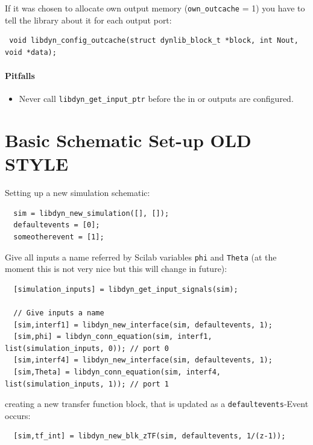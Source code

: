 \documentclass[%
	pdftex,%
	a4paper,%
	oneside,%
	11pt,%
	halfparskip,%
	headsepline,%
	bibtotocnumbered,%
	idxtotoc%
]{scrartcl}
\begin{document}
If it was chosen to allocate own output memory (\texttt{own\_outcache} = 1) you have to tell the library about it for each output port:

\begin{verbatim}
 void libdyn_config_outcache(struct dynlib_block_t *block, int Nout,  void *data);
\end{verbatim}



\paragraph{Pitfalls}

\begin{itemize}
 \item Never call \texttt{libdyn\_get\_input\_ptr} before the in or outputs are configured.
\end{itemize}




\section{Basic Schematic Set-up OLD STYLE}

Setting up a new simulation schematic:

\begin{verbatim}
  sim = libdyn_new_simulation([], []);
  defaultevents = [0];
  someotherevent = [1]; 
\end{verbatim}

Give all inputs a name referred by Scilab variables \texttt{phi} and \texttt{Theta} (at the moment this is not very nice but this will change in future):

\begin{verbatim}
  [simulation_inputs] = libdyn_get_input_signals(sim);
  
  // Give inputs a name
  [sim,interf1] = libdyn_new_interface(sim, defaultevents, 1);
  [sim,phi] = libdyn_conn_equation(sim, interf1, list(simulation_inputs, 0)); // port 0
  [sim,interf4] = libdyn_new_interface(sim, defaultevents, 1);
  [sim,Theta] = libdyn_conn_equation(sim, interf4, list(simulation_inputs, 1)); // port 1
\end{verbatim}

creating a new transfer function block, that is updated as a \texttt{defaultevents}-Event occurs:

\begin{verbatim}  
  [sim,tf_int] = libdyn_new_blk_zTF(sim, defaultevents, 1/(z-1));
\end{verbatim}
\end{document}
